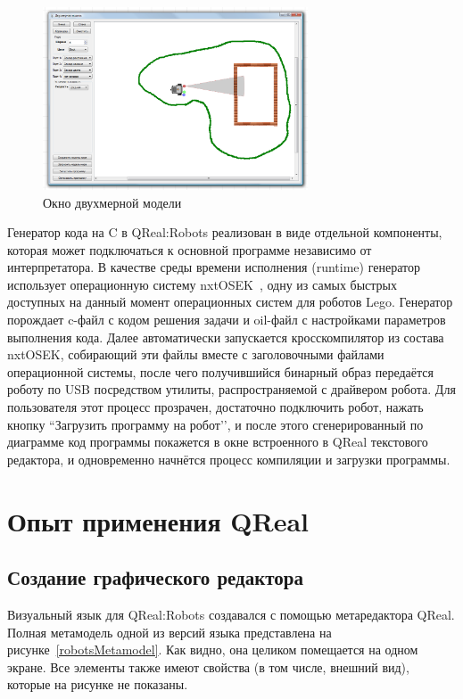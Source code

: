 \documentclass[a4paper]{article}
\begin{document}
\begin{figure} [ht]
  \begin{center}
    \includegraphics[width=0.7\textwidth]{2dModel.png}
    \caption{Окно двухмерной модели}
    \label{2dModel}
  \end{center}
\end{figure}

Генератор кода на C в QReal:Robots реализован в виде отдельной компоненты, которая может подключаться к основной программе независимо от интерпретатора. В качестве среды времени исполнения (runtime) генератор использует операционную систему nxtOSEK~\cite{nxtOsek}, одну из самых быстрых доступных на данный момент операционных систем для роботов Lego. Генератор порождает c-файл с кодом решения задачи и oil-файл с настройками параметров выполнения кода. Далее автоматически запускается кросскомпилятор из состава nxtOSEK, собирающий эти файлы вместе с заголовочными файлами операционной системы, после чего получившийся бинарный образ передаётся роботу по USB посредством утилиты, распространяемой с драйвером робота. Для пользователя этот процесс прозрачен, достаточно подключить робот, нажать кнопку ``Загрузить программу на робот’’, и после этого сгенерированный по диаграмме код программы покажется в окне встроенного в QReal текстового редактора, и одновременно начнётся процесс компиляции и загрузки программы.

\section{Опыт применения QReal}
\subsection{Создание графического редактора}
Визуальный язык для QReal:Robots создавался с помощью метаредактора QReal. Полная метамодель одной из версий языка представлена на рисунке~\ref{robotsMetamodel}. Как видно, она целиком помещается на одном экране. Все элементы также имеют свойства (в том числе, внешний вид), которые на рисунке не показаны.
\end{document}
